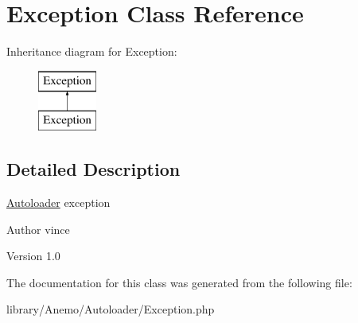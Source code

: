 \hypertarget{class_anemo_1_1_autoloader_1_1_exception}{
\section{Exception Class Reference}
\label{class_anemo_1_1_autoloader_1_1_exception}
}
Inheritance diagram for Exception:\begin{figure}[H]
\begin{center}
\leavevmode
\includegraphics[height=2.000000cm]{class_anemo_1_1_autoloader_1_1_exception}
\end{center}
\end{figure}


\subsection{Detailed Description}
\hyperlink{class_anemo_1_1_autoloader}{Autoloader} exception \begin{DoxyAuthor}{Author}
vince 
\end{DoxyAuthor}
\begin{DoxyVersion}{Version}
1.0 
\end{DoxyVersion}


The documentation for this class was generated from the following file:\begin{DoxyCompactItemize}
\item 
library/Anemo/Autoloader/Exception.php\end{DoxyCompactItemize}
